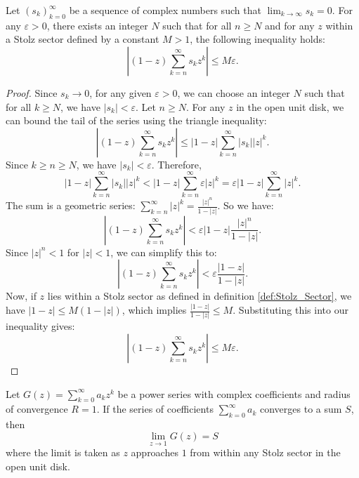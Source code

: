\begin{lemma}
    \label{lem:Bound_on_the_Tail_Sum}
    Let $(s_k)_{k=0}^{\infty}$ be a sequence of complex numbers such that $\lim_{k \to \infty} s_k = 0$. For any $\varepsilon > 0$, there exists an integer $N$ such that for all $n \geq N$ and for any $z$ within a Stolz sector defined by a constant $M > 1$, the following inequality holds:
    \[
        \left|(1-z)\sum_{k=n}^{\infty} s_k z^k\right| \leq M\varepsilon.
    \]
\end{lemma}
\begin{proof}
    Since $s_k \to 0$, for any given $\varepsilon > 0$, we can choose an integer $N$ such that for all $k \geq N$, we have $|s_k| < \varepsilon$.
    Let $n \geq N$. For any $z$ in the open unit disk, we can bound the tail of the series using the triangle inequality:
    \[
        \left|(1-z)\sum_{k=n}^{\infty} s_k z^k\right| \leq |1-z| \sum_{k=n}^{\infty} |s_k| |z|^k.
    \]
    Since $k \geq n \geq N$, we have $|s_k| < \varepsilon$. Therefore,
    \[
        |1-z| \sum_{k=n}^{\infty} |s_k| |z|^k < |1-z| \sum_{k=n}^{\infty} \varepsilon |z|^k = \varepsilon |1-z| \sum_{k=n}^{\infty} |z|^k.
    \]
    The sum is a geometric series: $\sum_{k=n}^{\infty} |z|^k = \frac{|z|^n}{1-|z|}$. So we have:
    \[
        \left|(1-z)\sum_{k=n}^{\infty} s_k z^k\right| < \varepsilon |1-z| \frac{|z|^n}{1-|z|}.
    \]
    Since $|z|^n < 1$ for $|z|<1$, we can simplify this to:
    \[
        \left|(1-z)\sum_{k=n}^{\infty} s_k z^k\right| < \varepsilon \frac{|1-z|}{1-|z|}.
    \]
    Now, if $z$ lies within a Stolz sector as defined in definition \ref{def:Stolz_Sector}, we have $|1-z| \leq M(1-|z|)$, which implies $\frac{|1-z|}{1-|z|} \leq M$.
    Substituting this into our inequality gives:
    \[
        \left|(1-z)\sum_{k=n}^{\infty} s_k z^k\right| \leq M\varepsilon.
    \]
\end{proof}

\begin{theorem}
    \label{thm:Abels_Theorem}
    Let $G(z) = \sum_{k=0}^{\infty} a_k z^k$ be a power series with complex coefficients and radius of convergence $R=1$. If the series of coefficients $\sum_{k=0}^{\infty} a_k$ converges to a sum $S$, then
    \[
        \lim_{z \to 1} G(z) = S
    \]
    where the limit is taken as $z$ approaches $1$ from within any Stolz sector in the open unit disk.
\end{theorem}

